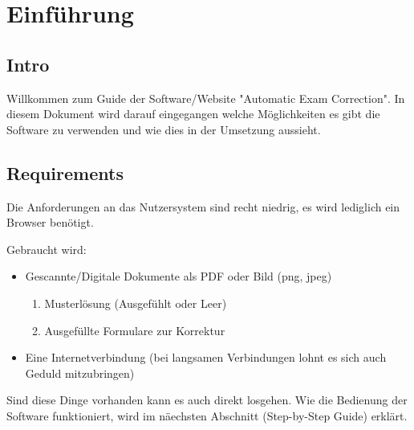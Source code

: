 \author{Tadd\"aus Nauheimer}
\chapter{Einf\"uhrung}

\section{Intro}

Willkommen zum Guide der Software/Website "Automatic Exam Correction".
In diesem Dokument wird darauf eingegangen welche M\"oglichkeiten es gibt die Software zu verwenden und wie dies in der Umsetzung aussieht.

\section{Requirements}

Die Anforderungen an das Nutzersystem sind recht niedrig, es wird lediglich ein Browser ben\"otigt.

Gebraucht wird:
\begin{itemize}
	\item Gescannte/Digitale Dokumente als PDF oder Bild (png, jpeg)
		\begin{enumerate}
			\item Musterl\"osung (Ausgef\"uhlt oder Leer)
			\item Ausgef\"ullte Formulare zur Korrektur
		\end{enumerate}
	\item Eine Internetverbindung (bei langsamen Verbindungen lohnt es sich auch Geduld mitzubringen)
\end{itemize}

Sind diese Dinge vorhanden kann es auch direkt losgehen.
Wie die Bedienung der Software funktioniert, wird im n\"aechsten Abschnitt (Step-by-Step Guide) erkl\"art. 
